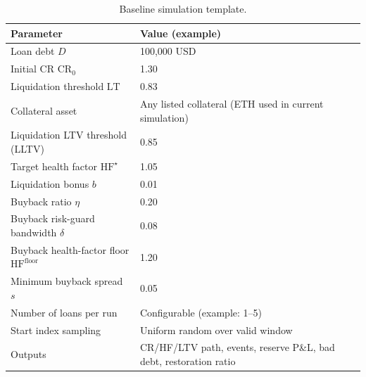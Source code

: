 \documentclass[12pt]{article}
\begin{document}
\begin{table}[h!]
\centering
\caption{Baseline simulation template.}
\label{tab:baseline}
\begin{tabular}{@{}l p{}@{}}
\toprule
Parameter & Value (example) \\
\midrule
Loan debt $D$ & 100,000 USD \\
Initial CR $\mathrm{CR}_0$ & 1.30 \\
Liquidation threshold $\mathrm{LT}$ & 0.83 \\
Collateral asset & Any listed collateral (ETH used in current simulation) \\
Liquidation LTV threshold (LLTV) & 0.85 \\
Target health factor $\mathrm{HF}^{\star}$ & 1.05 \\
Liquidation bonus $b$ & 0.01 \\
Buyback ratio $\eta$ & 0.20 \\
Buyback risk-guard bandwidth $\delta$ & 0.08 \\
Buyback health-factor floor $\mathrm{HF}^{\text{floor}}$ & 1.20 \\
Minimum buyback spread $s$ & 0.05 \\
Number of loans per run & Configurable (example: 1--5) \\
Start index sampling & Uniform random over valid window \\
Outputs & CR/HF/LTV path, events, reserve P\&L, bad debt, restoration ratio \\
\bottomrule
\end{tabular}
\end{table}



\end{document}
